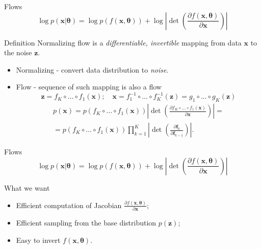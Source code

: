\documentclass{beamer}
\newcommand{\bx}{\mathbf{x}}
\newcommand{\bz}{\mathbf{z}}
\newcommand{\btheta}{\boldsymbol{\theta}}
\begin{document}
\begin{frame}{Flows}
	\[
	\log p(\bx|\btheta) = \log p(f(\bx, \btheta)) + \log \left|\det \left( \frac{\partial f(\bx, \btheta)}{\partial \bx} \right) \right|
	\]
	\begin{block}{Definition}
		Normalizing flow is a \textit{differentiable, invertible} mapping from data $\bx$ to the noise $\bz$. 
	\end{block}
	\begin{itemize}
		\item Normalizing - convert data distribution to \textit{noise}.
		\item Flow - sequence of such mapping is also a flow
		\[
		\bz = f_K \circ \dots \circ f_1(\bx); \quad \bx = f_1^{-1} \circ \dots \circ f_K^{-1} (\bz) = g_1 \circ \dots \circ g_K(\bz) 
		\] 
		\begin{multline*}
			p(\bx) = p(f_K \circ \dots \circ f_1(\bx)) \left|\det \left(\frac{\partial f_K \circ \dots \circ f_1(\bx)}{\partial \bx} \right) \right| = \\
			= p(f_K \circ \dots \circ f_1(\bx)) \prod_{k=1}^K \left|\det \left(\frac{\partial \mathbf{f}_k}{\partial \mathbf{f}_{k-1}} \right) \right|.
		\end{multline*}
	\end{itemize}
\end{frame}
\begin{frame}{Flows}
	\[
	\log p(\bx|\btheta) = \log p(f(\bx, \btheta)) + \log \left|\det \left( \frac{\partial f(\bx, \btheta)}{\partial \bx} \right) \right|
	\]
	\begin{block}{What we want}
		\begin{itemize}
			\item Efficient computation of Jacobian $\frac{\partial f(\bx, \btheta)}{\partial \bx}$;
			\item Efficient sampling from the base distribution $p(\bz)$;
			\item Easy to invert $f(\bx, \btheta)$.
		\end{itemize}
		
	\end{block}
	
\end{frame}
\end{document}
